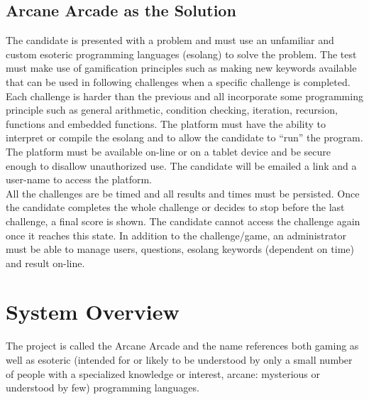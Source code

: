 \documentclass[english]{article}
\begin{document}
		\subsection{Arcane Arcade as the Solution}
		The candidate is presented with a problem and must use an unfamiliar and custom esoteric programming languages (esolang) to solve the problem. The test must make use of gamification principles such as making new keywords available that can be used in following challenges when a specific challenge is completed. 
		\\[12pt]
		Each challenge is harder than the previous and all incorporate some programming principle such as general arithmetic, condition checking, iteration, recursion, functions and embedded functions. The platform must have the ability to interpret or compile the esolang and to allow the candidate to “run” the program. The platform must be available on-line or on a tablet device and be secure enough to disallow unauthorized use. The candidate will be emailed a link and a user-name to access the platform. 
		\\[12pt]
		All the challenges are be timed and all results and times must be persisted. Once the candidate completes the whole challenge or decides to stop before the last challenge, a final score is shown. The candidate cannot access the challenge again once it reaches this state. In addition to the challenge/game, an administrator must be able to manage users, questions, esolang keywords (dependent on time) and result on-line.
		
		
	\section{System Overview}
	The project is called the Arcane Arcade and the name references both gaming as well as esoteric (intended for or likely to be understood by only a 		small number of people with a specialized knowledge or interest, arcane: mysterious or understood by few) programming languages.
	
\end{document}
